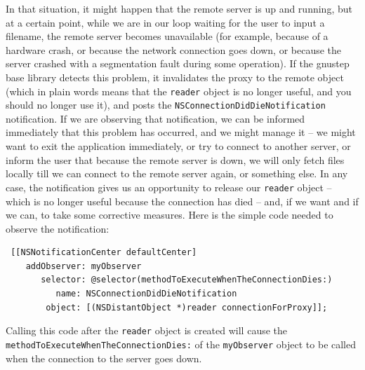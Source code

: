 \documentclass[a4paper]{article}
\begin{document}
In that situation, it might happen that the remote server is up and
running, but at a certain point, while we are in our loop waiting for
the user to input a filename, the remote server becomes unavailable
(for example, because of a hardware crash, or because the network
connection goes down, or because the server crashed with a
segmentation fault during some operation).  If the gnustep base
library detects this problem, it invalidates the proxy to the remote
object (which in plain words means that the \texttt{reader} object is
no longer useful, and you should no longer use it), and posts the
\texttt{NSConnectionDidDieNotification} notification.  If we are
observing that notification, we can be informed immediately that this
problem has occurred, and we might manage it -- we might want to exit
the application immediately, or try to connect to another server, or
inform the user that because the remote server is down, we will only
fetch files locally till we can connect to the remote server again, or
something else.  In any case, the notification gives us an opportunity
to release our \texttt{reader} object -- which is no longer useful
because the connection has died -- and, if we want and if we can, to
take some corrective measures.  Here is the simple code needed to
observe the notification:
\begin{verbatim}
 [[NSNotificationCenter defaultCenter]
    addObserver: myObserver
       selector: @selector(methodToExecuteWhenTheConnectionDies:)
          name: NSConnectionDidDieNotification
        object: [(NSDistantObject *)reader connectionForProxy]];
\end{verbatim}
Calling this code after the \texttt{reader} object is created will
cause the \texttt{methodToExecuteWhenTheConnectionDies:} of the
\texttt{myObserver} object to be called when the connection to the
server goes down.
\end{document}
